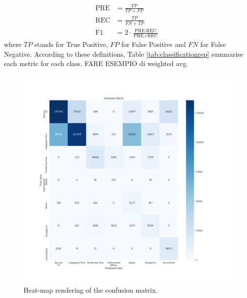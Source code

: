 \begin{equation}
\begin{aligned}
\text{PRE} &= \frac{TP}{TP+FP} \\
\text{REC} &= \frac{TP}{FN+TP} \\
\text{F1} &= 2 \cdot \frac{\text{PRE} \cdot \text{REC}}{\text{PRE} + \text{REC}}
\end{aligned}
\end{equation}
where $TP$ stands for True Positive, $FP$ for False Positive and $FN$ for False Negative. According to these definitions, Table \ref{tab:classificationrep} summarise each metric for each class. FARE ESEMPIO di weighted avg.
\begin{figure}
\centering
\includegraphics[width=\textwidth]{./TeX_files/img/confmatheatmap.png}
\caption{Heat-map rendering of the confusion matrix.}
\label{fig:confmatheatmap}
\end{figure}
